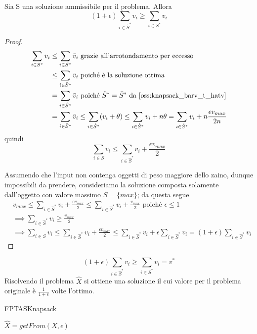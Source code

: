 \begin{lemma}
	Sia S una soluzione ammissibile per il problema. Allora
	$$
		(1+\epsilon)\sum_{i \in \hat{S}^*} v_i \geq \sum_{i \in S^*} v_i
	$$
\end{lemma}
\begin{proof}
	\begin{align*}
		 \sum_{i \in S^*} v_i & \leq \sum_{i \in S^*} \bar{v}_i  \text{ grazie all'arrotondamento per eccesso}                      \\
		 & \leq \sum_{ i \in \bar{S}^*} \bar{v}_i  \text{ poiché è la soluzione ottima}                                         \\
		 & = \sum_{ i \in \hat{S}^*} \bar{v}_i \text{ poiché } \hat{S}^* = \bar{S}^* \text{ da \cref{oss:knapsack_barv_t_hatv}} \\
		 & = \sum_{i \in \bar{S}^*} \bar{v}_i \leq \sum_{i \in \hat{S}^*} (v_i + \theta) \leq
		\sum_{i \in \hat{S}^*} v_i + n \theta = \sum_{i \in \hat{S}^*} v_i + n \frac{\epsilon v_{max}}{2 n}
	\end{align*}
	quindi
	$$
		\sum_{i \in S} v_i  \leq \sum_{i \in \hat{S}^*} v_i + \frac{\epsilon v_{max}}{2}
	$$

	Assumendo che l'input non contenga oggetti di peso maggiore dello zaino,
	dunque impossibili da prendere, consideriamo la soluzione composta
	solamente dall'oggetto con valore massimo $S = \{max\}$;
	da questa segue
	\begin{align*}
		 & v_{max} \leq \sum_{i \in \hat{S}^*} v_i + \frac{\epsilon v_{max}}{2}
		\leq \sum_{i \in \hat{S}^*} v_i + \frac{v_{max}}{2} \text{ poiché } \epsilon \leq 1         \\
		 & \implies \sum_{i \in \hat{S}^*} v_i \geq \frac{v_{max}}{2}                               \\
		 & \implies \sum_{i \in S} v_i \leq \sum_{i \in \hat{S}^*} v_i + \frac{\epsilon v_{max}}{2}
		\leq \sum_{i \in \hat{S}^*}v_i + \epsilon \sum_{i \in \hat{S}^*} v_i = (1 + \epsilon) \sum_{i \in \hat{S}^*} v_i
	\end{align*}
\end{proof}
\begin{theorem}
	$$
		(1+\epsilon)\sum_{i \in \hat{S}^*} v_i \geq \sum_{i \in S^*} v_i = v^*
	$$
	Risolvendo il problema $\hat{X}$ si ottiene una soluzione il cui valore
	per il problema originale è
	$\frac{1}{1+\epsilon}$
	volte l'ottimo.
\end{theorem}

\begin{algorithm}
	\caption{FPTASKnapsack}
	\label{algo:FPTASKnapsack}

	$
		\hat{X} = getFrom(X, \epsilon)
	$


\end{algorithm}

